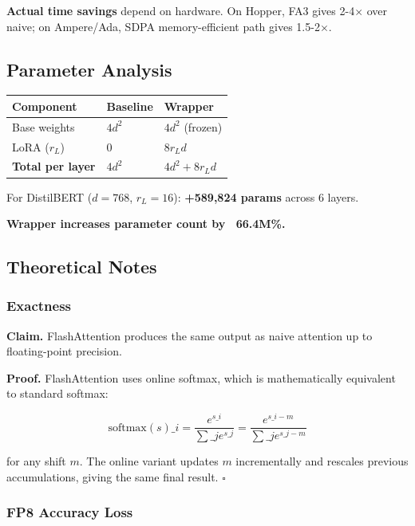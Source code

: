 \textbf{Actual time savings} depend on hardware. On Hopper, FA3 gives 2-4$\times$ over 
naive; on Ampere/Ada, SDPA memory-efficient path gives 1.5-2$\times$.

\subsection{Parameter Analysis}

\begin{table}[H]
\centering
\small
\begin{tabular}{lll}
\toprule
\textbf{Component} & \textbf{Baseline} & \textbf{Wrapper} \\
\midrule
Base weights & $4 d^2$ & $4 d^2$ (frozen) \\
LoRA ($r_L$) & 0 & $8 r_L d$ \\
\textbf{Total per layer} & $4 d^2$ & $4 d^2 + 8 r_L d$ \\
\bottomrule
\end{tabular}
\end{table}

For DistilBERT ($d=768$, $r_L=16$): \textbf{+589,824 params} across 6 layers.

\textbf{Wrapper increases parameter count by ~66.4M\%.}

\subsection{Theoretical Notes}

\subsubsection{Exactness}

\textbf{Claim.} FlashAttention produces the same output as naive attention up to 
floating-point precision.

\textbf{Proof.} FlashAttention uses online softmax, which is mathematically 
equivalent to standard softmax:

\[
\text{softmax}(s)\_i = \frac{e^{s\_i}}{\sum\_j e^{s\_j}} = \frac{e^{s\_i - m}}{\sum\_j e^{s\_j - m}}
\tag{4.5}
\]

for any shift $m$. The online variant updates $m$ incrementally and rescales 
previous accumulations, giving the same final result. $\square$

\subsubsection{FP8 Accuracy Loss}

